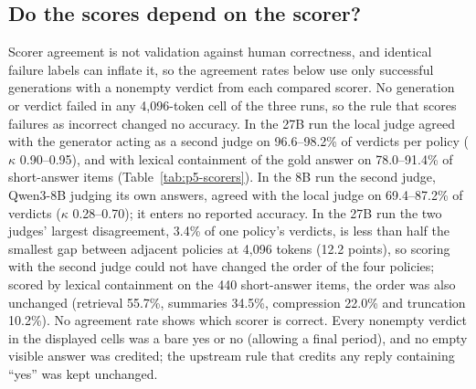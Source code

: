 {\subsection{Do the scores depend on the scorer?}\label{sec:scorers}
Scorer agreement is not validation against human correctness, and identical failure labels can inflate it, so the agreement rates below use only successful generations with a nonempty verdict from each compared scorer. No generation or verdict failed in any 4,096-token cell of the three runs, so the rule that scores failures as incorrect changed no accuracy. In the 27B run the local judge agreed with the generator acting as a second judge on 96.6--98.2\% of verdicts per policy ($\kappa$ 0.90--0.95), and with lexical containment of the gold answer on 78.0--91.4\% of short-answer items (Table~\ref{tab:p5-scorers}). In the 8B run the second judge, Qwen3-8B judging its own answers, agreed with the local judge on 69.4--87.2\% of verdicts ($\kappa$ 0.28--0.70); it enters no reported accuracy. In the 27B run the two judges' largest disagreement, 3.4\% of one policy's verdicts, is less than half the smallest gap between adjacent policies at 4,096 tokens (12.2 points), so scoring with the second judge could not have changed the order of the four policies; scored by lexical containment on the 440 short-answer items, the order was also unchanged (retrieval 55.7\%, summaries 34.5\%, compression 22.0\% and truncation 10.2\%). No agreement rate shows which scorer is correct. Every nonempty verdict in the displayed cells was a bare yes or no (allowing a final period), and no empty visible answer was credited; the upstream rule that credits any reply containing ``yes'' was kept unchanged.

}
